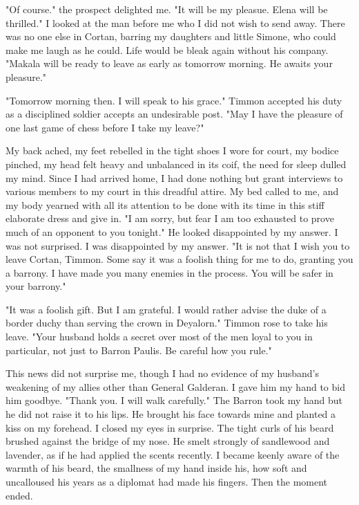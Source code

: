 \documentclass{article}
\begin{document}
"Of course." the prospect delighted me. "It will be my pleasue. Elena will be thrilled." I looked at the man before me who I did not wish to send away. There was no one else in Cortan, barring my daughters and little Simone, who could make me laugh as he could. Life would be bleak again without his company. "Makala will be ready to leave as early as tomorrow morning. He awaits your pleasure." 

"Tomorrow morning then. I will speak to his grace." Timmon accepted his duty as a disciplined soldier accepts an undesirable post. "May I have the pleasure of one last game of chess before I take my leave?"

My back ached, my feet rebelled in the tight shoes I wore for court, my bodice pinched, my head felt heavy and unbalanced in its coif, the need for sleep dulled my mind. Since I had arrived home, I had done nothing but grant interviews to various members to my court in this dreadful attire. My bed called to me, and my body yearned with all its attention to be done with its time in this stiff elaborate dress and give in. "I am sorry, but fear I am too exhausted to prove much of an opponent to you tonight." He looked disappointed by my answer. I was not surprised. I was disappointed by my answer. "It is not that I wish you to leave Cortan, Timmon. Some say it was a foolish thing for me to do, granting you a barrony. I have made you many enemies in the process. You will be safer in your barrony."

"It was a foolish gift. But I am grateful. I would rather advise the duke of a border duchy than serving the crown in Deyalorn." Timmon rose to take his leave. "Your husband holds a secret over most of the men loyal to you in particular, not just to Barron Paulis. Be careful how you rule."

This news did not surprise me, though I had no evidence of my husband's weakening of my allies other than General Galderan. I gave him my hand to bid him goodbye. "Thank you. I will walk carefully." The Barron took my hand but he did not raise it to his lips. He brought his face towards mine and planted a kiss on my forehead. I closed my eyes in surprise. The tight curls of his beard brushed against the bridge of my nose. He smelt strongly of sandlewood and lavender, as if he had applied the scents recently. I became keenly aware of the warmth of his beard, the smallness of my hand inside his, how soft and uncalloused his years as a diplomat had made his fingers. Then the moment ended. 
\end{document}
